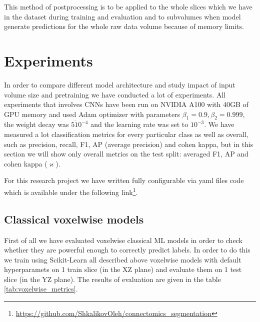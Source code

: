 \documentclass[twocolumn, a4paper]{article}
\theoremstyle{definition}
\begin{document}
This method of postprocessing is to be applied to the whole slices which we have in the dataset during training and
evaluation and to subvolumes when model generate predictions for the whole raw data volume because of memory limits.

\section{Experiments}
In order to compare different model architecture and study impact of input volume size and pretraining we
have conducted a lot of experiments. All experiments that involves CNNs have been run on NVIDIA A100 with 40GB of GPU memory
and used Adam optimizer with parameters \( \beta_1=0.9, \beta_2=0.999 \), the weight decay was \( 5 \dot 10^{-4} \)
and the learning rate was set to \( 10^{-3} \). We have measured a lot classification metrics for every
particular class as well as overall, such as precision, recall, F1, AP (average precision) and cohen kappa,
but in this section we will show only overall metrics on the test split: averaged F1, AP and cohen kappa (\(\varkappa\)).

For this research project we have written fully configurable via yaml files code which is available under the following
link\footnote{\url{https://github.com/ShkalikovOleh/connectomics_segmentation}}.

\subsection{Classical voxelwise models} \label{sec:voxelwise_expr}
First of all we have evaluated voxelwise classical ML models in order to check whether they are powerful enough to
correctly predict labels. In order to do this we train using Scikit-Learn \cite{scikit-learn} all described above
voxelwise models with default hyperparamets on 1 train slice (in the XZ plane)
and evaluate them on 1 test slice (in the YZ plane). The results of evaluation are given in the table
\ref{tab:voxelwise_metrics}.
\end{document}
